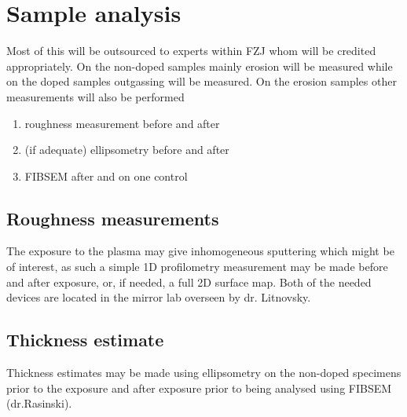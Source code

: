 \documentclass{article}
\begin{document}
\section{Sample analysis}
Most of this will be outsourced to experts within FZJ whom will
be credited appropriately. 
On the non-doped samples mainly erosion will be measured while on the doped samples outgassing
will be measured. On the erosion samples other measurements will also be performed
\begin{enumerate}
    \item roughness measurement before and after
    \item (if adequate) ellipsometry before and after
    \item FIBSEM after and on one control
\end{enumerate}
\subsection{Roughness measurements}
The exposure to the plasma may give inhomogeneous sputtering which might be
of interest, as such a simple 1D profilometry measurement may be made before
and after exposure, or, if needed, a full 2D surface map. Both of the needed
devices are located in the mirror lab overseen by dr. Litnovsky.
\subsection{Thickness estimate}
Thickness estimates may be made using ellipsometry on the non-doped specimens prior
to the exposure and after exposure prior to being analysed using FIBSEM (dr.Rasinski).


\end{document}
